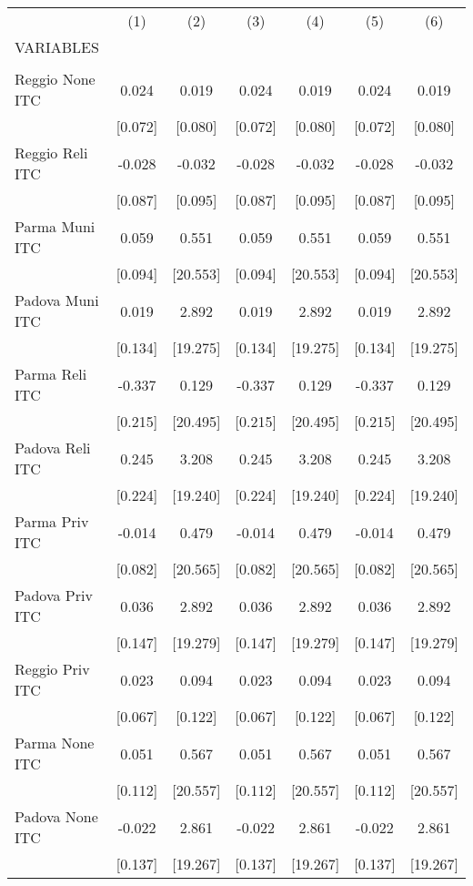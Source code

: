 \begin{tabular}{lcccccc} \hline
 & (1) & (2) & (3) & (4) & (5) & (6) \\
VARIABLES &  &  &  &  &  &  \\ \hline
 &  &  &  &  &  &  \\
Reggio None ITC & 0.024 & 0.019 & 0.024 & 0.019 & 0.024 & 0.019 \\
 & [0.072] & [0.080] & [0.072] & [0.080] & [0.072] & [0.080] \\
Reggio Reli ITC & -0.028 & -0.032 & -0.028 & -0.032 & -0.028 & -0.032 \\
 & [0.087] & [0.095] & [0.087] & [0.095] & [0.087] & [0.095] \\
Parma Muni ITC & 0.059 & 0.551 & 0.059 & 0.551 & 0.059 & 0.551 \\
 & [0.094] & [20.553] & [0.094] & [20.553] & [0.094] & [20.553] \\
Padova Muni ITC & 0.019 & 2.892 & 0.019 & 2.892 & 0.019 & 2.892 \\
 & [0.134] & [19.275] & [0.134] & [19.275] & [0.134] & [19.275] \\
Parma Reli ITC & -0.337 & 0.129 & -0.337 & 0.129 & -0.337 & 0.129 \\
 & [0.215] & [20.495] & [0.215] & [20.495] & [0.215] & [20.495] \\
Padova Reli ITC & 0.245 & 3.208 & 0.245 & 3.208 & 0.245 & 3.208 \\
 & [0.224] & [19.240] & [0.224] & [19.240] & [0.224] & [19.240] \\
Parma Priv ITC & -0.014 & 0.479 & -0.014 & 0.479 & -0.014 & 0.479 \\
 & [0.082] & [20.565] & [0.082] & [20.565] & [0.082] & [20.565] \\
Padova Priv ITC & 0.036 & 2.892 & 0.036 & 2.892 & 0.036 & 2.892 \\
 & [0.147] & [19.279] & [0.147] & [19.279] & [0.147] & [19.279] \\
Reggio Priv ITC & 0.023 & 0.094 & 0.023 & 0.094 & 0.023 & 0.094 \\
 & [0.067] & [0.122] & [0.067] & [0.122] & [0.067] & [0.122] \\
Parma None ITC & 0.051 & 0.567 & 0.051 & 0.567 & 0.051 & 0.567 \\
 & [0.112] & [20.557] & [0.112] & [20.557] & [0.112] & [20.557] \\
Padova None ITC & -0.022 & 2.861 & -0.022 & 2.861 & -0.022 & 2.861 \\
 & [0.137] & [19.267] & [0.137] & [19.267] & [0.137] & [19.267] \\

\end{tabular}
